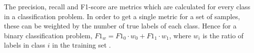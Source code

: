The precision, recall and F1-score are metrics which are calculated for every class in a classification problem. In order to get a single metric for a set of samples, these can be weighted by the number of true labels of each class. Hence for a binary classification problem, $\textit{F1}_w = \textit{F1}_0 \cdot w_0 + \textit{F1}_1 \cdot w_1$, where $w_i$ is the ratio of labels in class $i$ in the training set \citep{Ting2017}. 

